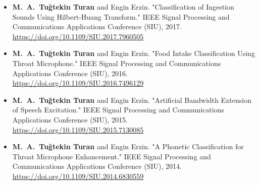 \documentclass[margin, 10pt]{res} %
\begin{document}
\begin{resume}
\begin{itemize}[leftmargin=*]
    \item \textbf{M.~A.~Tu\u{g}tekin Turan} and Engin Erzin. "Classification of Ingestion Sounds Using Hilbert-Huang Transform." IEEE Signal Processing and Communications Applications Conference (SIU), 2017. \\ \url{https://doi.org/10.1109/SIU.2017.7960505}

    \item \textbf{M.~A.~Tu\u{g}tekin Turan} and Engin Erzin. "Food Intake Classification Using Throat Microphone." IEEE Signal Processing and Communications Applications Conference (SIU), 2016. \url{https://doi.org/10.1109/SIU.2016.7496129}

    \item \textbf{M.~A.~Tu\u{g}tekin Turan} and Engin Erzin. "Artificial Bandwidth Extension of Speech Excitation." IEEE Signal Processing and Communications Applications Conference (SIU), 2015. \url{https://doi.org/10.1109/SIU.2015.7130085}

    \item \textbf{M.~A.~Tu\u{g}tekin Turan} and Engin Erzin. "A Phonetic Classification for Throat Microphone Enhancement." IEEE Signal Processing and Communications Applications Conference (SIU), 2014. \\ \url{https://doi.org/10.1109/SIU.2014.6830559}
\end{itemize}

\end{resume}
\end{document}
